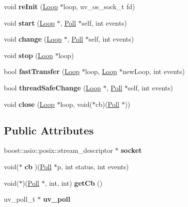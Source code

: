 \begin{DoxyCompactItemize}
void {\bfseries re\+Init} (\mbox{\hyperlink{struct_loop}{Loop}} $\ast$loop, uv\+\_\+os\+\_\+sock\+\_\+t fd)
\item 
\mbox{\label{struct_poll_a3268413bab124a7cd0858cc829f4677e}} 
void {\bfseries start} (\mbox{\hyperlink{struct_loop}{Loop}} $\ast$, \mbox{\hyperlink{struct_poll}{Poll}} $\ast$self, int events)
\item 
\mbox{\label{struct_poll_a1d04ee5275507b8c02b6f10d31acfb2c}} 
void {\bfseries change} (\mbox{\hyperlink{struct_loop}{Loop}} $\ast$, \mbox{\hyperlink{struct_poll}{Poll}} $\ast$self, int events)
\item 
\mbox{\label{struct_poll_af77fdd073ba25acdff5455fe04d4377b}} 
void {\bfseries stop} (\mbox{\hyperlink{struct_loop}{Loop}} $\ast$loop)
\item 
\mbox{\label{struct_poll_af924777c7d22e9b178f1e466e61d18ba}} 
bool {\bfseries fast\+Transfer} (\mbox{\hyperlink{struct_loop}{Loop}} $\ast$loop, \mbox{\hyperlink{struct_loop}{Loop}} $\ast$new\+Loop, int events)
\item 
\mbox{\label{struct_poll_aaf1f84a41b94385b7f967254416735ae}} 
bool {\bfseries thread\+Safe\+Change} (\mbox{\hyperlink{struct_loop}{Loop}} $\ast$, \mbox{\hyperlink{struct_poll}{Poll}} $\ast$self, int events)
\item 
\mbox{\label{struct_poll_ac300fe377eb859743d91014acedd3168}} 
void {\bfseries close} (\mbox{\hyperlink{struct_loop}{Loop}} $\ast$loop, void($\ast$cb)(\mbox{\hyperlink{struct_poll}{Poll}} $\ast$))
\end{DoxyCompactItemize}
\subsection*{Public Attributes}
\begin{DoxyCompactItemize}
\item 
\mbox{\label{struct_poll_acd3909f3114818e3d6f05119def97152}} 
boost\+::asio\+::posix\+::stream\+\_\+descriptor $\ast$ {\bfseries socket}
\item 
\mbox{\label{struct_poll_a8babf1d31fb8f0396dcd81d54c06f6b5}} 
void($\ast$ {\bfseries cb} )(\mbox{\hyperlink{struct_poll}{Poll}} $\ast$p, int status, int events)
\item 
\mbox{\label{struct_poll_a77e70c7d0ac563de8193c39feeccc860}} 
void($\ast$)(\mbox{\hyperlink{struct_poll}{Poll}} $\ast$, int, int) {\bfseries get\+Cb} ()
\item 
\mbox{\label{struct_poll_aaa351dbeceda08d7c74c994407500101}} 
uv\+\_\+poll\+\_\+t $\ast$ {\bfseries uv\+\_\+poll}
\end{DoxyCompactItemize}

